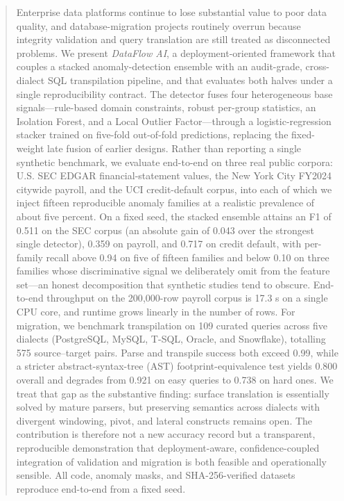 \documentclass{ieeeaccess}
\begin{document}
\begin{abstract}
Enterprise data platforms continue to lose substantial value to poor data
quality, and database-migration projects routinely overrun because integrity
validation and query translation are still treated as disconnected problems.
We present \emph{DataFlow AI}, a deployment-oriented framework that couples a
stacked anomaly-detection ensemble with an audit-grade, cross-dialect SQL
transpilation pipeline, and that evaluates both halves under a single
reproducibility contract. The detector fuses four heterogeneous base
signals---rule-based domain constraints, robust per-group statistics, an
Isolation Forest, and a Local Outlier Factor---through a logistic-regression
stacker trained on five-fold out-of-fold predictions, replacing the fixed-weight
late fusion of earlier designs. Rather than reporting a single synthetic
benchmark, we evaluate end-to-end on three real public corpora: U.S. SEC EDGAR
financial-statement values, the New York City FY2024 citywide payroll, and the
UCI credit-default corpus, into each of which we inject fifteen reproducible
anomaly families at a realistic prevalence of about five percent. On a fixed
seed, the stacked ensemble attains an F1 of 0.511 on the SEC corpus (an absolute
gain of 0.043 over the strongest single detector), 0.359 on payroll, and 0.717
on credit default, with per-family recall above 0.94 on five of fifteen families
and below 0.10 on three families whose discriminative signal we deliberately
omit from the feature set---an honest decomposition that synthetic studies tend
to obscure. End-to-end throughput on the 200{,}000-row payroll corpus is 17.3 s
on a single CPU core, and runtime grows linearly in the number of rows. For
migration, we benchmark transpilation on 109 curated queries across five dialects
(PostgreSQL, MySQL, T-SQL, Oracle, and Snowflake), totalling 575 source--target
pairs. Parse and transpile success both exceed 0.99, while a stricter
abstract-syntax-tree (AST) footprint-equivalence test yields 0.800 overall and
degrades from 0.921 on easy queries to 0.738 on hard ones. We treat that gap as
the substantive finding: surface translation is essentially solved by mature
parsers, but preserving semantics across dialects with divergent windowing,
pivot, and lateral constructs remains open. The contribution is therefore not a
new accuracy record but a transparent, reproducible demonstration that
deployment-aware, confidence-coupled integration of validation and migration is
both feasible and operationally sensible. All code, anomaly masks, and
SHA-256-verified datasets reproduce end-to-end from a fixed seed.
\end{abstract}
\end{document}
